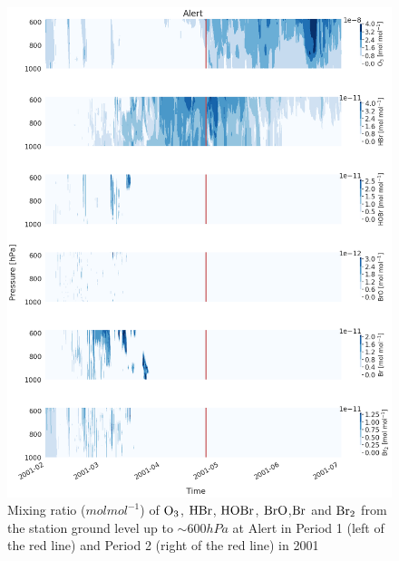\begin{figure}[h]
    \centering
    \includegraphics[width=\linewidth]{Chapter6_Results/images/Vert_StationComp_2001/vert_all_species_ALT.png}
    \caption{Mixing ratio ($mol mol^{-1}$) of $\mathrm{O_3}$, $\mathrm{HBr}$, $\mathrm{HOBr}$, $\mathrm{BrO}$,$\mathrm{Br}$ and $\mathrm{Br_2}$ from the station ground level up to $\sim 600 hPa$ at Alert in Period 1 (left of the red line) and Period 2 (right of the red line) in 2001}
    \label{fig:vert_ALT}
\end{figure}